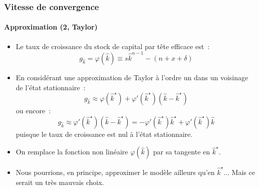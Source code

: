 \documentclass[10pt,notheorems]{beamer}
\theoremstyle{plain}
\theoremstyle{definition} %
\begin{document}
\begin{frame}
  \frametitle{Vitesse de convergence}
  \framesubtitle{Approximation (2, Taylor)}

  \begin{itemize}

  \item Le taux de croissance du stock de capital par tête efficace est~:
    \[
      g_{\hat k} = \varphi(\hat k) \equiv s \hat k^{\alpha-1} - (n+x+\delta)
    \]

  \item En considérant une approximation de Taylor à l'ordre un dans un voisinage de l'état stationnaire~:
    \[
      g_{\hat k} \approx \varphi(\hat k^{\star}) + \varphi'(\hat k^{\star}) (\hat k - \hat k^\star)
    \]
    ou encore~:
    \[
      g_{\hat k} \approx \varphi'(\hat k^{\star}) (\hat k - \hat k^\star) = -\varphi'(\hat k^{\star})\hat k^\star + \varphi'(\hat k^{\star})\hat k
    \]
    puisque le taux de croissance est nul à l'état stationnaire.\newline

  \item On remplace la fonction non linéaire $\varphi(\hat k)$ par sa tangente en $\hat k^\star$.\newline

  \item Nous pourrions, en principe, approximer le modèle ailleurs qu'en $\hat k^{\star}$... Mais ce serait un très mauvais choix.

  \end{itemize}

\end{frame}
\end{document}
